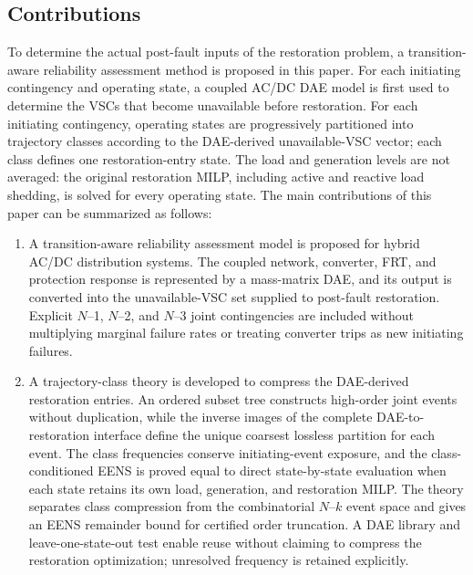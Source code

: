 \documentclass[journal]{IEEEtran}
\begin{document}
\subsection{Contributions}

To determine the actual post-fault inputs of the restoration problem, a
transition-aware reliability assessment method is proposed in this paper. For
each initiating contingency and operating state, a coupled AC/DC DAE model is
first used to determine the VSCs that become unavailable before restoration.
For each initiating contingency, operating states are progressively partitioned
into trajectory classes according to the DAE-derived unavailable-VSC vector;
each class defines one restoration-entry state. The load and
generation levels are not averaged: the original restoration MILP, including
active and reactive load shedding, is solved for every operating state. The
main contributions of this paper can be summarized as follows:

\begin{enumerate}
    \item A transition-aware reliability assessment model is proposed for
    hybrid AC/DC distribution systems. The coupled network, converter, FRT, and
    protection response is represented by a mass-matrix DAE, and its output is
    converted into the unavailable-VSC set supplied to post-fault restoration.
    Explicit $N$--1, $N$--2, and $N$--3 joint contingencies are included without
    multiplying marginal failure rates or treating converter trips as new
    initiating failures.

    \item A trajectory-class theory is developed to compress the DAE-derived
    restoration entries. An ordered subset tree constructs high-order joint
    events without duplication, while the inverse images of the complete
    DAE-to-restoration interface define the unique coarsest lossless partition
    for each event. The class frequencies conserve initiating-event exposure,
    and the class-conditioned EENS is proved equal to direct state-by-state
    evaluation when each state retains its own load, generation, and restoration
    MILP. The theory separates class compression from the combinatorial
    $N$--$k$ event space and gives an EENS remainder bound for certified order
    truncation. A DAE library and leave-one-state-out test enable reuse without
    claiming to compress the restoration optimization; unresolved frequency is
    retained explicitly.
\end{enumerate}
\end{document}
